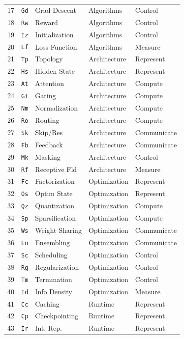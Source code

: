 \begin{table}[!t]
\begin{minipage}[t]{0.49\textwidth}
\begin{tabular}{@{}r l l l l@{}}
17 & \texttt{Gd} & Grad Descent & Algorithms & Control \\
18 & \texttt{Rw} & Reward & Algorithms & Control \\
19 & \texttt{Iz} & Initialization & Algorithms & Control \\
20 & \texttt{Lf} & Loss Function & Algorithms & Measure \\
21 & \texttt{Tp} & Topology & Architecture & Represent \\
22 & \texttt{Hs} & Hidden State & Architecture & Represent \\
23 & \texttt{At} & Attention & Architecture & Compute \\
24 & \texttt{Gt} & Gating & Architecture & Compute \\
25 & \texttt{Nm} & Normalization & Architecture & Compute \\
26 & \texttt{Ro} & Routing & Architecture & Compute \\
27 & \texttt{Sk} & Skip/Res & Architecture & Communicate \\
28 & \texttt{Fb} & Feedback & Architecture & Communicate \\
29 & \texttt{Mk} & Masking & Architecture & Control \\
30 & \texttt{Rf} & Receptive Fld & Architecture & Measure \\
31 & \texttt{Fc} & Factorization & Optimization & Represent \\
32 & \texttt{Os} & Optim State & Optimization & Represent \\
33 & \texttt{Qz} & Quantization & Optimization & Compute \\
34 & \texttt{Sp} & Sparsification & Optimization & Compute \\
35 & \texttt{Ws} & Weight Sharing & Optimization & Communicate \\
36 & \texttt{En} & Ensembling & Optimization & Communicate \\
37 & \texttt{Sc} & Scheduling & Optimization & Control \\
38 & \texttt{Rg} & Regularization & Optimization & Control \\
39 & \texttt{Tm} & Termination & Optimization & Control \\
40 & \texttt{Id} & Info Density & Optimization & Measure \\
41 & \texttt{Cc} & Caching & Runtime & Represent \\
42 & \texttt{Cp} & Checkpointing & Runtime & Represent \\
43 & \texttt{Ir} & Int. Rep. & Runtime & Represent \\

\end{tabular}
\end{minipage}
\end{table}
